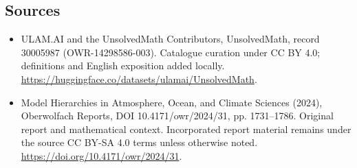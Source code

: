 \documentclass[11pt]{article}
\begin{document}
\subsection{Sources}
\begin{itemize}
\item[\hypertarget{source:30005987:1}{S1}] ULAM.AI and the UnsolvedMath Contributors, UnsolvedMath, record 30005987 (OWR-14298586-003). Catalogue curation under CC BY 4.0; definitions and English exposition added locally.
\url{https://huggingface.co/datasets/ulamai/UnsolvedMath}.
\item[\hypertarget{source:30005987:2}{S2}] Model Hierarchies in Atmosphere, Ocean, and Climate Sciences (2024), Oberwolfach Reports, DOI 10.4171/owr/2024/31, pp. 1731--1786. Original report and mathematical context. Incorporated report material remains under the source CC BY-SA 4.0 terms unless otherwise noted.
\url{https://doi.org/10.4171/owr/2024/31}.
\end{itemize}
\label{end:30005987}
\end{document}
